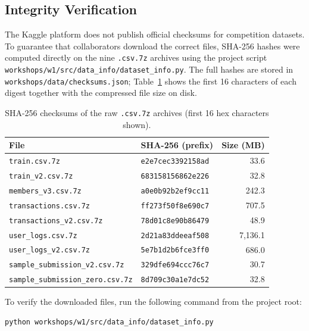 \documentclass{article}
\begin{document}
\subsection{Integrity Verification}

The Kaggle platform does not publish official checksums for competition datasets. To guarantee that collaborators download the correct files, SHA-256 hashes were computed directly on the nine \texttt{.csv.7z} archives using the project script \texttt{workshops/w1/src/data\_info/dataset\_info.py}. The full hashes are stored in \texttt{workshops/data/checksums.json}; Table~\ref{tab:integrity} shows the first 16 characters of each digest together with the compressed file size on disk.

\begin{table}[H]
\centering
\begin{tabular}{llr}
\toprule
\textbf{File} & \textbf{SHA-256 (prefix)} & \textbf{Size (MB)} \\
\midrule
\texttt{train.csv.7z}                    & \texttt{e2e7cec3392158ad} &    33.6 \\
\texttt{train\_v2.csv.7z}                & \texttt{683158156862e226} &    32.8 \\
\texttt{members\_v3.csv.7z}              & \texttt{a0e0b92b2ef9cc11} &   242.3 \\
\texttt{transactions.csv.7z}             & \texttt{ff273f50f8e690c7} &   707.5 \\
\texttt{transactions\_v2.csv.7z}         & \texttt{78d01c8e90b86479} &    48.9 \\
\texttt{user\_logs.csv.7z}               & \texttt{2d21a83ddeeaf508} & 7{,}136.1 \\
\texttt{user\_logs\_v2.csv.7z}           & \texttt{5e7b1d2b6fce3ff0} &   686.0 \\
\texttt{sample\_submission\_v2.csv.7z}   & \texttt{329dfe694ccc76c7} &    30.7 \\
\texttt{sample\_submission\_zero.csv.7z} & \texttt{8d709c30a1e7dc52} &    32.8 \\
\bottomrule
\end{tabular}
\caption{SHA-256 checksums of the raw \texttt{.csv.7z} archives (first 16 hex characters shown).}
\label{tab:integrity}
\end{table}

To verify the downloaded files, run the following command from the project root:

\begin{lstlisting}[language=bash]
python workshops/w1/src/data_info/dataset_info.py
\end{lstlisting}
\end{document}
